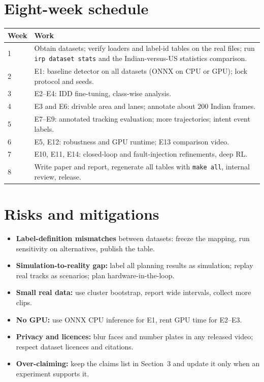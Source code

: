 \documentclass[11pt,a4paper]{article}
\begin{document}
\section{Eight-week schedule}
\begin{table}[h]
\centering\small
\begin{tabular}{@{}lp{13.2cm}@{}}
\toprule
Week & Work \\
\midrule
1 & Obtain datasets; verify loaders and label-id tables on the real files; run \texttt{irp dataset stats} and the Indian-versus-US statistics comparison. \\
2 & E1: baseline detector on all datasets (ONNX on CPU or GPU); lock protocol and seeds. \\
3 & E2--E4: IDD fine-tuning, class-wise analysis. \\
4 & E3 and E6: drivable area and lanes; annotate about 200 Indian frames. \\
5 & E7--E9: annotated tracking evaluation; more trajectories; intent event labels. \\
6 & E5, E12: robustness and GPU runtime; E13 comparison video. \\
7 & E10, E11, E14: closed-loop and fault-injection refinements, deep RL. \\
8 & Write paper and report, regenerate all tables with \texttt{make all}, internal review, release. \\
\bottomrule
\end{tabular}
\end{table}

\section{Risks and mitigations}
\begin{itemize}
\item \textbf{Label-definition mismatches} between datasets: freeze the mapping, run sensitivity on alternatives, publish the table.
\item \textbf{Simulation-to-reality gap:} label all planning results as simulation; replay real tracks as scenarios; plan hardware-in-the-loop.
\item \textbf{Small real data:} use cluster bootstrap, report wide intervals, collect more clips.
\item \textbf{No GPU:} use ONNX CPU inference for E1, rent GPU time for E2--E3.
\item \textbf{Privacy and licences:} blur faces and number plates in any released video; respect dataset licences and citations.
\item \textbf{Over-claiming:} keep the claims list in Section~3 and update it only when an experiment supports it.
\end{itemize}
\end{document}

